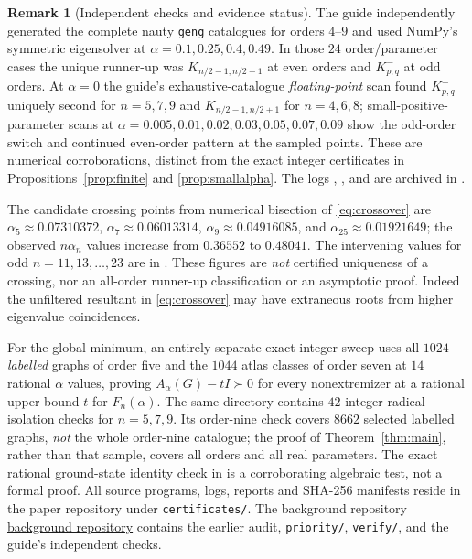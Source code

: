 \documentclass[11pt]{amsart}
\theoremstyle{definition}
\newtheorem{remark}[theorem]{Remark}
\begin{document}
\begin{remark}[Independent checks and evidence status]\label{rem:evidence}
The guide independently generated the complete nauty \texttt{geng} catalogues for orders $4$--$9$ and used NumPy's symmetric eigensolver at $\alpha=0.1,0.25,0.4,0.49$. In those $24$ order/parameter cases the unique runner-up was $K_{n/2-1,n/2+1}$ at even orders and $K_{p,q}^{-}$ at odd orders. At $\alpha=0$ the guide's exhaustive-catalogue \emph{floating-point} scan found $K_{p,q}^{+}$ uniquely second for $n=5,7,9$ and $K_{n/2-1,n/2+1}$ for $n=4,6,8$; small-positive-parameter scans at $\alpha=0.005,0.01,0.02,0.03,0.05,0.07,0.09$ show the odd-order switch and continued even-order pattern at the sampled points. These are numerical corroborations, distinct from the exact integer certificates in Propositions~\ref{prop:finite} and \ref{prop:smallalpha}. The logs , , and  are archived in .

The candidate crossing points from numerical bisection of \eqref{eq:crossover} are $\alpha_5\approx0.07310372$, $\alpha_7\approx0.06013314$, $\alpha_9\approx0.04916085$, and $\alpha_{25}\approx0.01921649$; the observed $n\alpha_n$ values increase from $0.36552$ to $0.48041$. The intervening values for odd $n=11,13,\ldots,23$ are in . These figures are \emph{not} certified uniqueness of a crossing, nor an all-order runner-up classification or an asymptotic proof. Indeed the unfiltered resultant in \eqref{eq:crossover} may have extraneous roots from higher eigenvalue coincidences.

For the global minimum, an entirely separate exact integer sweep uses all $1024$ \emph{labelled} graphs of order five and the $1044$ atlas classes of order seven at $14$ rational $\alpha$ values, proving $A_\alpha(G)-tI\succ0$ for every nonextremizer at a rational upper bound $t$ for $F_n(\alpha)$. The same directory contains $42$ integer radical-isolation checks for $n=5,7,9$. Its order-nine check covers $8662$ selected labelled graphs, \emph{not} the whole order-nine catalogue; the proof of Theorem~\ref{thm:main}, rather than that sample, covers all orders and all real parameters. The exact rational ground-state identity check in  is a corroborating algebraic test, not a formal proof. All source programs, logs, reports and SHA-256 manifests reside in the paper repository \cite{AthanorArchive} under \texttt{certificates/}. The background repository \href{https://github.com/iwasborninbali/athanor-aalpha-spectral}{background repository} contains the earlier audit, \texttt{priority/}, \texttt{verify/}, and the guide's independent checks.
\end{remark}
\end{document}
